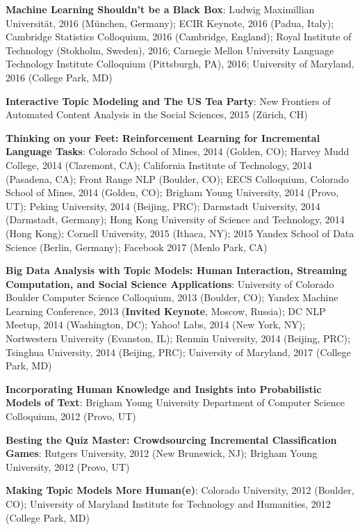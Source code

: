 {{\begin{enumerate*}
\item {\bf Machine Learning Shouldn't be a Black Box}: Ludwig
  Maximillian Universit\"at, 2016 (M\"unchen, Germany); ECIR Keynote,
  2016 (Padua, Italy); Cambridge Statistics Colloquium, 2016
  (Cambridge, England); Royal Institute of Technology (Stokholm,
  Sweden), 2016; Carnegie Mellon University Language Technology
    Institute Colloquium (Pittsburgh, PA), 2016; University of
    Maryland, 2016 (College Park, MD)
	\item {\bf Interactive Topic Modeling and The US Tea Party}:
          New Frontiers of Automated Content Analysis in the Social
          Sciences, 2015 (Z\"urich, CH)
	\item {\bf Thinking on your Feet: Reinforcement Learning for Incremental
Language Tasks}: Colorado School of Mines, 2014 (Golden, CO); Harvey
Mudd College, 2014 (Claremont, CA); California Institute of
Technology, 2014 (Pasadena, CA); Front Range NLP (Boulder, CO); EECS
Colloquium, Colorado School of Mines, 2014 (Golden, CO); Brigham Young
University, 2014 (Provo, UT); Peking University, 2014 (Beijing, PRC);
Darmstadt University, 2014 (Darmstadt, Germany); Hong Kong University
of Science and Technology, 2014 (Hong Kong); Cornell University, 2015
(Ithaca, NY); 2015 Yandex School of Data Science (Berlin, Germany);
Facebook 2017 (Menlo Park, CA)
	\item {\bf Big Data Analysis with Topic Models: Human
            Interaction, Streaming Computation, and Social Science
            Applications}: University of Colorado Boulder Computer
          Science Colloquium, 2013 (Boulder, CO); Yandex Machine
          Learning Conference, 2013 ({\bf Invited Keynote}, Moscow,
          Russia); DC NLP Meetup, 2014 (Washington, DC); Yahoo! Labs, 2014 (New
          York, NY); Nortwestern University (Evanston, IL); Renmin
          University, 2014 (Beijing, PRC); Tsinghua University, 2014
          (Beijing, PRC); University of Maryland, 2017 (College Park,
          MD)
	\item {\bf Incorporating Human Knowledge and Insights into Probabilistic Models of Text}: Brigham Young University Department of Computer Science Colloquium, 2012 (Provo, UT)
	\item {\bf Besting the Quiz Master: Crowdsourcing Incremental Classification Games}: Rutgers University, 2012 (New Brunswick, NJ); Brigham Young University, 2012 (Provo, UT)
	\item {\bf Making Topic Models More Human(e)}: Colorado University, 2012 (Boulder, CO); University of Maryland Institute for Technology and Humanities, 2012 (College Park, MD)

\end{enumerate*}}}

